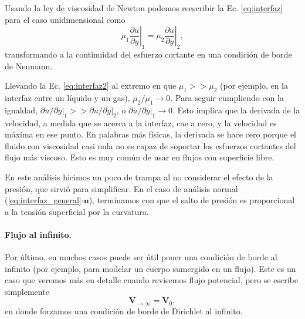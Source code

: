Usando la ley de viscosidad de Newton podemos reescribir la Ec. \eqref{eq:interfaz} para el caso unidimensional como
%
\begin{equation}\label{eq:interfaz2}
\left.\mu_1\frac{\partial u}{\partial y}\right|_1 = \left.\mu_2\frac{\partial u}{\partial y}\right|_2,
\end{equation}
%
transformando a la continuidad del esfuerzo cortante en una condición de borde de Neumann.

Llevando la Ec. \eqref{eq:interfaz2} al extremo en que $\mu_1>>\mu_2$ (por ejemplo, en la interfaz entre un líquido y un gas), $\mu_2/\mu_1\to0$.
Para seguir cumpliendo con la igualdad, $\left.\partial u/\partial y\right|_1>>\left.\partial u/\partial y\right|_2$, o $\left.\partial u/\partial y\right|_1\to0$.
Esto implica que la derivada de la velocidad, a medida que se acerca a la interfaz, cae a cero, y la velocidad es máxima en ese punto.
En palabras más físicas, la derivada se hace cero porque el fluido con viscosidad casi nula no es capaz de soportar los esfuerzos cortantes del flujo más viscoso.
Esto es muy común de usar en flujos con superficie libre.

En este análisis hicimos un poco de trampa al no considerar el efecto de la presión, que sirvió para simplificar. 
En el caso de análisis normal (\eqref{eq:interfaz_general}$\cdot\mathbf{n}$), terminamos con que el salto de presión es proporcional a la tensión superficial por la curvatura. 

\paragraph*{Flujo al infinito.}
Por último, en muchos casos puede ser útil poner una condición de borde al infinito (por ejemplo, para modelar un cuerpo sumergido en un flujo).
Este es un caso que veremos más en detalle cuando revisemos flujo potencial, pero se escribe simplemente
%
\begin{equation}
\mathbf{V}_{\to\infty} = \mathbf{V}_0,
\end{equation}
%
en donde forzamos una condición de borde de Dirichlet al infinito.
